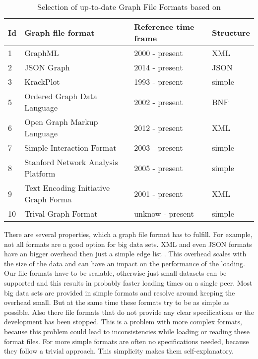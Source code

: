 \begin{table}[H]
\begin{center}
		\caption{Selection of up-to-date Graph File Formats based on \cite{Roughan.10.03.2015}}
    \begin{tabular}{| l | l | l | l |}
    \hline
	\bfseries Id & \bfseries Graph file format & \bfseries Reference time frame & \bfseries Structure\\ \hline
	1 & GraphML & 2000 - present & XML\\ \hline
	2 & JSON Graph & 2014 - present & JSON\\ \hline
	3 & KrackPlot & 1993 - present & simple\\ \hline
	5 & Ordered Graph Data Language & 2002 - present & BNF\\ \hline
	6 & Open Graph Markup Language & 2012 - present & XML\\ \hline
	7 & Simple Interaction Format & 2003 - present & simple\\ \hline
	8 & Stanford Network Analysis Platform & 2005 - present & simple\\ \hline
	9 & Text Encoding Initiative Graph Forma & 2001 - present & XML\\ \hline 
	10 & Trival Graph Format & unknow - present & simple\\ \hline

    \end{tabular}
\end{center}
\label{tabelle_avarage_time.10}
\end{table}
 There are several properties, which a graph file format has to fulfill. For example, not all formats are a good option for big data sets. XML and even JSON formats have an bigger overhead then just a simple edge list \cite{JSONvsXML.10}. This overhead scales with the size of the data and can have an impact on the performance of the loading. Our file formats have to be scalable, otherwise just small datasets can be supported and this results in probably faster loading times on a single peer. Most big data sets are provided in simple formats and resolve around keeping the overhead small. But at the same time these formats try to be as simple as possible.
 Also there file formats that do not provide any clear specifications or the development has been stopped. This is a problem with more complex formats, because this problem could lead to inconsistencies while loading or reading these format files. 
 For more simple formats are often no specifications needed, because they follow a trivial approach. This simplicity makes them self-explanatory.

